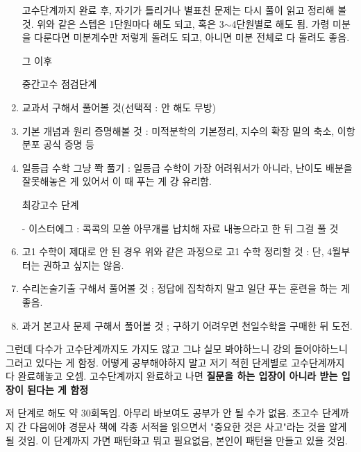 \begin{enumerate}
    고수단계까지 완료 후, 자기가 틀리거나 별표친 문제는 다시 풀이 읽고 정리해 볼 것.
    위와 같은 스텝은 1단원마다 해도 되고, 혹은 3$\sim$4단원별로 해도 됨.
    가령 미분을 다룬다면 미분계수만 저렇게 돌려도 되고, 아니면 미분 전체로 다 돌려도 좋음.
    \vspace{5mm}
    
    그 이후
    \vspace{5mm}
        
    중간고수 점검단계
    \vspace{5mm}

    \item 교과서 구해서 풀어볼 것(선택적 : 안 해도 무방)
    \item 기본 개념과 원리 증명해볼 것 : 미적분학의 기본정리, 지수의 확장 밑의 축소, 이항분포 공식 증명 등
    \item 일등급 수학 그냥 쫙 풀기 : 일등급 수학이 가장 어려워서가 아니라, 난이도 배분을 잘못해놓은 게 있어서 이 때 푸는 게 걍 유리함.
    \vspace{5mm}

    최강고수 단계
    \vspace{5mm}

    \item[-] 이스터에그 :  콕콕의 모쏠 아무개를 납치해 자료 내놓으라고 한 뒤 그걸 풀 것
    \item 고1 수학이 제대로 안 된 경우 위와 같은 과정으로 고1 수학 정리할 것 : 단, 4월부터는 권하고 싶지는 않음.
    \item 수리논술기출 구해서 풀어볼 것 ; 정답에 집착하지 말고 일단 푸는 훈련을 하는 게 좋음.
    \item 과거 본고사 문제 구해서 풀어볼 것 ; 구하기 어려우면 천일수학을 구매한 뒤 도전.
    \vspace{5mm}

\end{enumerate}
그런데 다수가 고수단계까지도 가지도 않고 그냐 실모 봐야하느니 강의 들어야하느니 그러고 있다는 게 함정.
어떻게 공부해야하지 말고 저기 적힌 단계별로 고수단계까지 다 완료해놓고 오셈.
고수단계까지 완료하고 나면 \textbf{질문을 하는 입장이 아니라 받는 입장이 된다는 게 함정}
\vspace{5mm}

저 단계로 해도 약 30회독임. 아무리 바보여도 공부가 안 될 수가 없음.
초고수 단계까지 간 다음에야 경문사 책에 각종 서적을 읽으면서 "중요한 것은 사고"라는 것을 알게 될 것임.
이 단계까지 가면 패턴화고 뭐고 필요없음, 본인이 패턴을 만들고 있을 것임.
\vspace{5mm}

